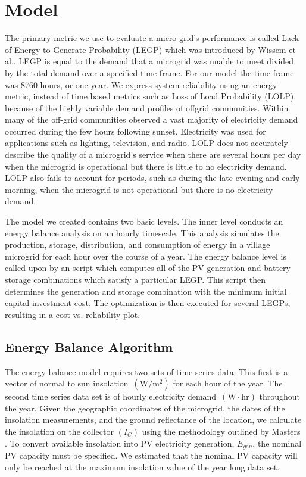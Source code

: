 \documentclass{article}
\newcommand{\unit}[1]{\ensuremath{\, \mathrm{#1}}}
\begin{document}
\section{Model}
The primary metric we use to evaluate a micro-grid's performance is called Lack of Energy to Generate Probability (LEGP) which was introduced by Wissem et al.\cite{}.
LEGP is equal to the demand that a microgrid was unable to meet divided by the total demand over a specified time frame. 
For our model the time frame was 8760 hours, or one year. 
We express system reliability using an energy metric, instead of time based metrics such as Loss of Load Probability (LOLP), because of the highly variable demand profiles of offgrid communities. 
Within many of the off-grid communities observed a vast majority of electricity demand occurred during the few hours following sunset.
Electricity was used for applications such as lighting, television, and radio. 
LOLP does not accurately describe the quality of a microgrid's service when there are several hours per day when the microgrid is operational but there is little to no electricity demand. 
LOLP also fails to account for periods, such as during the late evening and early morning, when the microgrid is not operational but there is no electricity demand.

The model we created contains two basic levels.
The inner level conducts an energy balance analysis on an hourly timescale.
This analysis simulates the production, storage, distribution, and consumption of energy in a village microgrid for each hour over the course of a year. 
The energy balance level is called upon by an script which computes all of the PV generation and battery storage combinations which satisfy a particular LEGP. 
This script then determines the generation and storage combination with the minimum initial capital investment cost. 
The optimization is then executed for several LEGPs, resulting in a cost vs. reliability plot.

\subsection{Energy Balance Algorithm}

The energy balance model requires two sets of time series data. 
This first is a vector of normal to sun insolation $\unit{(W/m^2)}$ for each hour of the year. The second time series data set is of hourly electricity demand $\unit{(W\cdot hr)}$ throughout the year. 
Given the geographic coordinates of the microgrid, the dates of the insolation measurements, and the ground reflectance of the location, we calculate the insolation on the collector $(I_C)$ using the methodology outlined by Masters \cite{}. To convert available insolation into PV electricity generation, $E_{gen}$, the nominal PV capacity must be specified. We estimated that the nominal PV capacity will only be reached at the maximum insolation value of the year long data set. 
\end{document}
